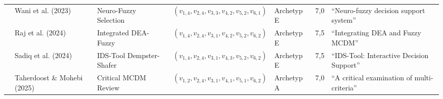 \begin{longtable}{p{2.0cm} p{2.6cm} p{2.8cm} p{2.7cm} p{2.2cm} p{1.0cm} p{2.5cm}}
\cite{8KF4HAZS} & Wani et al. (2023) & Neuro-Fuzzy Selection & $(v_{1,4}, v_{2,4}, v_{3,3}, v_{4,2}, v_{5,2}, v_{6,1})$ & Archetyp E & 7,0 & \enquote{Neuro-fuzzy decision support system} \\
\cite{YVWGHAWQ} & Raj et al. (2024) & Integrated DEA-Fuzzy & $(v_{1,4}, v_{2,4}, v_{3,1}, v_{4,2}, v_{5,2}, v_{6,2})$ & Archetyp E & 7,5 & \enquote{Integrating DEA and Fuzzy MCDM} \\
\cite{LNQHES84} & Sadiq et al. (2024) & IDS-Tool Dempster-Shafer & $(v_{1,4}, v_{2,4}, v_{3,1}, v_{4,3}, v_{5,2}, v_{6,2})$ & Archetyp E & 7,5 & \enquote{IDS-Tool: Interactive Decision Support} \\
\cite{LPC92LAP} & Taherdoost \& Mohebi (2025) & Critical MCDM Review & $(v_{1,2}, v_{2,4}, v_{3,1}, v_{4,1}, v_{5,1}, v_{6,2})$ & Archetyp A & 7,0 & \enquote{A critical examination of multi-criteria} \\
\end{longtable}
